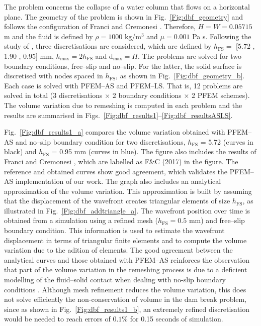 \documentclass[final,3p,times]{elsarticle}
\begin{document}
The problem concerns the collapse of a water column that flows on a horizontal plane. The geometry of the problem is shown in Fig.~\ref{Fig:dbf_geometry} and follows the configuration of Franci and Cremonesi \citep{franci2017effect}. Therefore, $H = W = 0.05715$ m and the fluid is defined by $\rho = 1000$ kg/m$^3$ and $\mu = 0.001$ Pa s. Following the study of \citep{franci2017effect}, three discretisations are considered, which are defined by $h_\mathrm{FS} =$ [5.72 , 1.90 , 0.95] mm, $h_\mathrm{max} = 2h_\mathrm{FS}$ and $\mathrm{d}_\mathrm{max} = H$. The problems are solved for two boundary conditions, free--slip and no--slip. For the latter, the solid surface is discretised with nodes spaced in $h_\mathrm{FS}$, as shown in Fig.~\ref{Fig:dbf_geometry_b}. Each case is solved with PFEM--AS and PFEM--LS. That is, 12 problems are solved in total (3 discretisations $\times$ 2 boundary conditions $\times$ 2 PFEM schemes). The volume variation due to remeshing is computed in each problem and the results are summarised in Figs.~\ref{Fig:dbf_results1}--\ref{Fig:dbf_resultsASLS}.


Fig.~\ref{Fig:dbf_results1_a} compares the volume variation obtained with PFEM--AS and no--slip boundary condition for two discretisations, $h_\mathrm{FS}$ = 5.72 (curves in black) and $h_\mathrm{FS}$ = 0.95 mm (curves in blue). The figure also includes the results of Franci and Cremonesi \citep{franci2017effect}, which are labelled as F$\&$C (2017) in the figure. The reference and obtained curves show good agreement, which validates the PFEM--AS implementation of our work. The graph also includes an analytical approximation of the volume variation. This approximation is built by assuming that the displacement of the wavefront creates triangular elements of size $h_\mathrm{FS}$, as illustrated in Fig.~\ref{Fig:dbf_addtriangle_a}. The wavefront position over time is obtained from a simulation using a refined mesh ($h_\mathrm{FS} = 0.5$ mm) and free--slip boundary condition. This information is used to estimate the wavefront displacement in terms of triangular finite elements and to compute the volume variation due to the adition of elements. The good agreement between the analytical curves and those obtained with PFEM--AS reinforces the observation that part of the volume variation in the remeshing process is due to a deficient modelling of the fluid--solid contact when dealing with no-slip boundary conditions \citep{cerquaglia2017free}. Although mesh refinement reduces the volume variation, this does not solve efficiently the non-conservation of volume in the dam break problem, since as shown in Fig.~\ref{Fig:dbf_results1_b}, an extremely refined discretisation would be needed to reach errors of $0.1\%$ for 0.15 seconds of simulation. 
\end{document}
